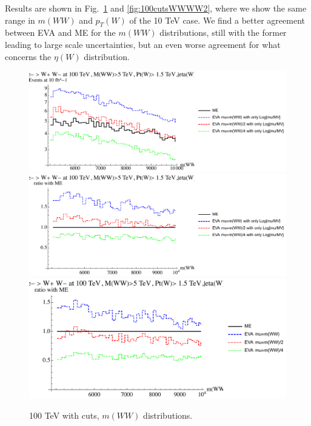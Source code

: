\documentclass[a4paper,11pt]{article}
\begin{document}
Results are shown in Fig.~\ref{fig:100cutsWWWW} and \ref{fig:100cutsWWWW2}, where we show the same range in $m(WW)$ and $p_T(W)$ of the 10 TeV case. We find a better agreement between EVA and ME for the $m(WW)$  distributions, still with the former leading to large scale uncertainties, but an even worse agreement for what concerns the $\eta(W)$ distribution.  



\begin{figure}[!t]
\includegraphics[width=0.46\linewidth]{Notebooks/PlotDistr/WW_WW/100TeVcuts/plotmWW.pdf}
\includegraphics[width=0.46\linewidth]{Notebooks/PlotDistr/WW_WW/100TeVcuts/plotmWWratio1.pdf}
\includegraphics[width=0.46\linewidth]{Notebooks/PlotDistr/WW_WW/100TeVcuts/plotmWWratio2.pdf}
\caption{100 TeV with cuts, $m(WW)$ distributions. \label{fig:100cutsWWWW}}
\end{figure}
\end{document}
